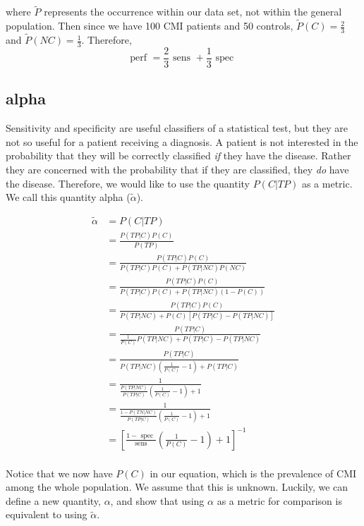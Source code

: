 \documentclass[10pt]{article}
\newcommand{\sens}{\mbox{ sens }}
\newcommand{\spec}{\mbox{ spec }}
\begin{document}
where $\tilde{P}$ represents the occurrence within our data set, not within the general population. Then since we have 100 CMI patients and 50 controls, $\tilde{P}(C) = \frac{2}{3}$ and $\tilde{P}(NC) = \frac{1}{3}$. Therefore, 
\begin{equation}
	\mbox{perf } = \frac{2}{3}\sens + \frac{1}{3}\spec
\end{equation}

\subsection{alpha}
Sensitivity and specificity are useful classifiers of a statistical test, but they are not so useful for a patient receiving a diagnosis. A patient is not interested in the probability that they will be correctly classified \emph{if} they have the disease. Rather they are concerned with the probability that if they are classified, they \emph{do} have the disease. Therefore, we would like to use the quantity $P(C|TP)$ as a metric. We call this quantity alpha ($\tilde\alpha$).

\begin{align*}
	\tilde\alpha &= P(C|TP) \\[1em]
		&= \frac{P(TP|C)P(C)}{P(TP)} \\[1em]
		&= \frac{P(TP|C)P(C)}{P(TP|C)P(C) + P(TP|NC)P(NC)} \\[1em]
		&= \frac{P(TP|C)P(C)}{P(TP|C)P(C) + P(TP|NC)(1-P(C))} \\[1em]
		&= \frac{P(TP|C)P(C)}{P(TP|NC) + P(C)[P(TP|C) - P(TP|NC)]} \\[1em]
		&= \frac{P(TP|C)}{\frac{1}{P(C)}P(TP|NC) + P(TP|C) - P(TP|NC)} \\[1em]
		&= \frac{P(TP|C)}{P(TP|NC)(\frac{1}{P(C)}-1) + P(TP|C)} \\[1em]
		&= \frac{1}{\frac{P(TP|NC)}{P(TP|C)}(\frac{1}{P(C)}-1) + 1} \\[1em]
		&= \frac{1}{\frac{1-P(TN|NC)}{P(TP|C)}(\frac{1}{P(C)}-1) + 1} \\[1em]
		&= \left[\frac{1-\spec}{\sens}\left(\frac{1}{P(C)} - 1 \right) + 1 \right]^{-1} \\[1em]
\end{align*}

Notice that we now have $P(C)$ in our equation, which is the prevalence of CMI among the whole population. We assume that this is unknown. Luckily, we can define a new quantity, $\alpha$, and show that using $\alpha$ as a metric for comparison is equivalent to using $\tilde\alpha$. \\
\end{document}
